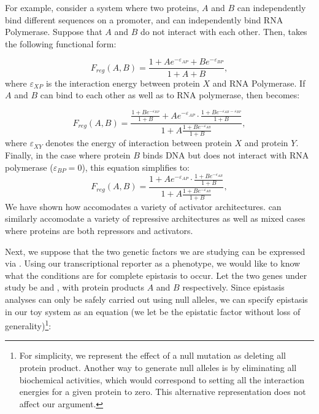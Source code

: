 For example, consider a system where two proteins, \(A\) and \(B\) can independently
bind different sequences on a promoter, and can independently bind RNA
Polymerase. Suppose that \(A\) and \(B\) do not interact with each other. Then,
\Freg{} takes the following functional form:

\begin{equation}
    F_{reg}(A, B) = \frac{1 + A e^{-\varepsilon _{AP}} + B e^{-\varepsilon _{BP}} }
                         {1 + A + B},
\end{equation}
where \(\varepsilon _{XP}\) is the interaction energy between protein \(X\) and RNA
Polymerase. If \(A\) and \(B\) can bind to each other as well as to RNA
polymerase, then \Freg{} becomes:

\begin{equation}
    F_{reg}(A, B) = \frac{\frac{1 + Be^{-\varepsilon _{BP}}}{1 + B} +
                          A e^{-\varepsilon _{AP}} \cdot
                              \frac{1 + B e^{-\varepsilon _{AB}-\varepsilon _{BP}}}
                                   {1 + B}
                          }
                         {1 + A\frac{1 + Be^{-\varepsilon_{AB} } }
                                    {1 + B}
                         },
\end{equation}
where \(\varepsilon_{XY}\) denotes the energy of interaction between protein \(X\)
and protein \(Y\). Finally, in the case where protein \(B\) binds DNA but does
not interact with RNA polymerase (\(\varepsilon_{BP} = 0\)), this equation
simplifies to:
\begin{equation}
    F_{reg}(A, B) = \frac{1 +
                          A e^{-\varepsilon _{AP}} \cdot
                              \frac{1 + B e^{-\varepsilon _{AB}}}
                                   {1 + B}
                          }
                         {1 + A\frac{1 + Be^{-\varepsilon_{AB} } }
                                    {1 + B}
                         },
\end{equation}
We have shown how \Freg{} accomodates a variety of activator architectures. \Freg{}
can similarly accomodate a variety of repressive architectures as well as mixed
cases where proteins are both repressors and activators.

Next, we suppose that the two genetic factors we are studying can be expressed
via \Freg. Using our transcriptional reporter as a phenotype, we would like
to know what the conditions are for complete epistasis to occur. Let the
two genes under study be  and , with protein products \(A\) and
\(B\) respectively. Since epistasis analyses can only be safely carried out using
null alleles, we can specify epistasis in our toy system as an equation (we let
 be the epistatic factor without loss of generality)\footnote{For
simplicity, we represent the effect of a null mutation as deleting all
protein product. Another way to generate null alleles is by eliminating all
biochemical activities, which would correspond to setting all the interaction
energies for a given protein to zero. This alternative representation does not
affect our argument.}:

